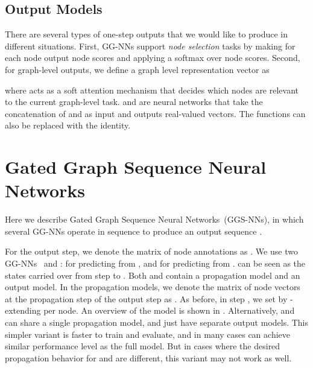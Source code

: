 \documentclass{article} \usepackage{iclr2016_conference,times}
\newcommand{\OurMethodMinorShort}{GG-NN}
\newcommand{\OurMethodMinorShorts}{\OurMethodMinorShort s}
\newcommand{\OurMethod}{Gated Graph Sequence Neural Network}
\newcommand{\OurMethods}{\OurMethod s}
\newcommand{\OurMethodShort}{GGS-NN}
\newcommand{\OurMethodShorts}{\OurMethodShort s}
\begin{document}
\subsection{Output Models}

There are several types of one-step outputs that we would like to
produce in different situations. 
First, \OurMethodMinorShorts{} support \emph{node selection} tasks by making 
 for each node 
output node scores and applying a softmax over node scores.
Second, for graph-level outputs, we define a graph level representation vector as

where  acts as a soft attention
mechanism that decides which nodes are relevant to the current graph-level
task.  and  are 
neural networks that
take the concatenation of  and  as input and outputs
real-valued vectors. The  functions can also be replaced with the identity.


\section{\OurMethods}

Here we describe \OurMethods~(\OurMethodShorts), in which several
\OurMethodMinorShorts{} operate in sequence to produce an output sequence
.

For the  output step, we denote the matrix of node annotations as
.
We use two \OurMethodMinorShorts~ and :  for
predicting  from , and  for
predicting  from .  can be seen as the states
carried over from step  to . Both  and 
contain a propagation model and an output model. In the propagation models, we denote the matrix of node vectors at the  propagation step of the
 output step as
.
As before, in step , we set  by -extending  per node.
An overview of the model is shown in .
Alternatively,  and  can share a single propagation
model, and just have separate output models. This simpler variant is faster to
train and evaluate, and in many cases can achieve similar performance level as
the full model.  But in cases where the desired propagation behavior for
 and  are different, this variant may not work as
well.
\end{document}
